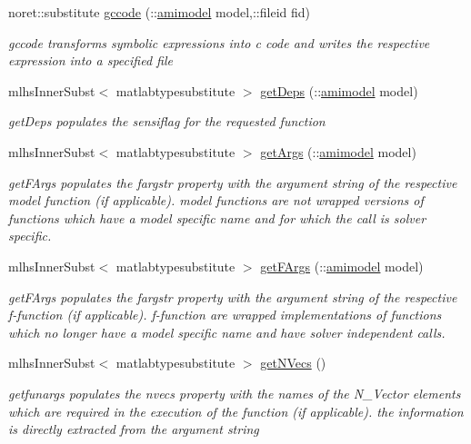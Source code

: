 \begin{DoxyCompactItemize}
noret\+::substitute \hyperlink{classamifun_a05444f498e657a0010f6b539bc9c6596}{gccode} (\+::\hyperlink{classamimodel}{amimodel} model,\+::fileid fid)
\begin{DoxyCompactList}\small\item\em gccode transforms symbolic expressions into c code and writes the respective expression into a specified file \end{DoxyCompactList}\item 
mlhs\+Inner\+Subst$<$ matlabtypesubstitute $>$ \hyperlink{classamifun_a1cb97b695ab609e1655ec1067b140b70}{get\+Deps} (\+::\hyperlink{classamimodel}{amimodel} model)
\begin{DoxyCompactList}\small\item\em get\+Deps populates the sensiflag for the requested function \end{DoxyCompactList}\item 
mlhs\+Inner\+Subst$<$ matlabtypesubstitute $>$ \hyperlink{classamifun_a4b16e7670c0d60e530545e58628bde3f}{get\+Args} (\+::\hyperlink{classamimodel}{amimodel} model)
\begin{DoxyCompactList}\small\item\em get\+F\+Args populates the fargstr property with the argument string of the respective model function (if applicable). model functions are not wrapped versions of functions which have a model specific name and for which the call is solver specific. \end{DoxyCompactList}\item 
mlhs\+Inner\+Subst$<$ matlabtypesubstitute $>$ \hyperlink{classamifun_aa1f074dbf83e821bc999eb2d701fd9ed}{get\+F\+Args} (\+::\hyperlink{classamimodel}{amimodel} model)
\begin{DoxyCompactList}\small\item\em get\+F\+Args populates the fargstr property with the argument string of the respective f-\/function (if applicable). f-\/function are wrapped implementations of functions which no longer have a model specific name and have solver independent calls. \end{DoxyCompactList}\item 
mlhs\+Inner\+Subst$<$ matlabtypesubstitute $>$ \hyperlink{classamifun_a3ae210044df5eb51e2f9280d03b86c3c}{get\+N\+Vecs} ()
\begin{DoxyCompactList}\small\item\em getfunargs populates the nvecs property with the names of the N\+\_\+\+Vector elements which are required in the execution of the function (if applicable). the information is directly extracted from the argument string \end{DoxyCompactList}\item 

\end{DoxyCompactItemize}
